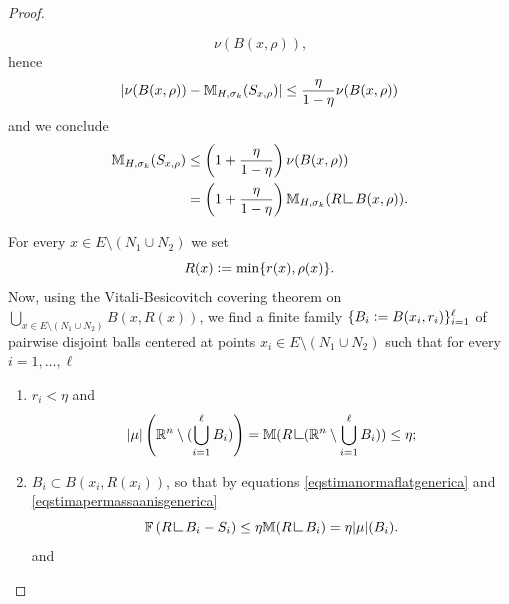 \documentclass{article}
\numberwithin{equation}{section}
\theoremstyle{plain}%
\theoremstyle{definition}
\theoremstyle{definition}
\newcommand{\rgrande}{\mathbb{R}}
\newcommand{\normaflat}{\mathbb{F}}
\newcommand{\massa}{\mathbb{M}}
\newcommand{\massaanisotropa}{\mathbb{M}_{H,\sigma_k}}
\newcommand{\mrestr}{\mathop{\hbox{\vrule height 7pt width 0.5pt depth 0pt
\vrule height 0.5pt width 6pt depth 0pt}}\nolimits}
\DeclarePairedDelimiter{\valass}{\lvert}{\rvert} %
\newcommand{\indice}{\ell}
\begin{document}
\begin{proof}
\begin{enumerate}
\begin{equation*}
                \nu (B(x,\rho))
                \text{,}
        \end{equation*}
        hence
        \begin{equation}
            \valass{\nu(B(x,\rho)) - \massaanisotropa(S_{x,\rho})}
        \leq
        \frac{\eta}{1-\eta} \nu (B(x,\rho))
        \end{equation}
        and we conclude
        \begin{equation}\label{eqstimapermassaanisgenerica}
        \begin{split}
            \massaanisotropa (S_{x,\rho})
            &
            \leq \left( 1 + \frac{\eta}{1- \eta} \right) \nu (B(x,\rho)) \\
            &
            = \left( 1 + \frac{\eta}{1- \eta} \right) \massaanisotropa(R \mrestr B(x,\rho) )
            \text{.}
            \end{split}
        \end{equation}
    \end{enumerate}
    For every $x \in E \setminus (N_1 \cup N_2)$ we set
    \begin{equation*}
        R(x) \vcentcolon = \min \{ r(x), \rho (x) \}
        \text{.}
    \end{equation*}
    Now, using the Vitali-Besicovitch covering theorem on $\bigcup_{x \in E \setminus (N_1 \cup N_2)} B(x, R(x))$, we find a finite family $\{ B_i \vcentcolon = B(x_i,r_i) \}_{i =1}^{\indice}$ of pairwise disjoint balls centered at points $x_i \in E \setminus (N_1 \cup N_2 )$ such that for every $i = 1, \ldots ,\indice$
     \begin{enumerate}
        \item[(a)] $r_i < \eta$ and
        \begin{equation}\label{eqmisuravitalibesicovitch}
        \valass{\mu} \left( \rgrande^n \setminus (\bigcup_{i=1}^{\indice} B_i) \right) = \massa(R \mrestr (\rgrande^n \setminus \bigcup_{i=1}^{\indice} B_i)) \leq \eta
        \text{;}
        \end{equation}
        \item[(b)] $B_i \subset B(x_i, R(x_i))$, so that by equations \eqref{eqstimanormaflatgenerica} and \eqref{eqstimapermassaanisgenerica}
        \begin{equation}\label{eqstimanormaflat1}
        \normaflat \left( R \mrestr B_i - S_i \right) \leq \eta \massa (R \mrestr B_i) = \eta \valass{\mu} (B_i)
        \text{.}
        \end{equation}
        and
        \begin{equation}\label{eqstimamassaanisotropa2}

\end{equation}
\end{enumerate}
\end{proof}
\end{document}
